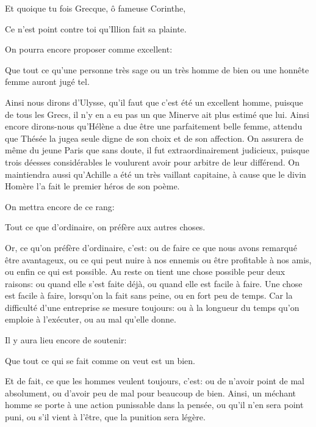 \begin{emphpar}
	   Et quoique tu fois Grecque, ô fameuse Corinthe,
	   
	   Ce n'est point contre toi qu'Illion fait sa plainte.
\end{emphpar}

\bigbreak

On pourra encore proposer comme excellent:

\begin{emphpar}
	   Que tout ce qu'une personne très sage ou un très homme de bien ou une honnête femme auront jugé tel.
\end{emphpar}

Ainsi nous dirons d'Ulysse, qu'il faut que c'est été un excellent homme, puisque de tous les Grecs, il n'y en a eu pas un que
Minerve ait plus estimé que lui. Ainsi encore dirons-nous qu'Hélène a due être une parfaitement belle femme, attendu que Thésée
la jugea seule digne de son choix et de son affection. On assurera de même du jeune Paris que sans doute, il fut extraordinairement
judicieux, puisque trois déesses considérables le voulurent avoir pour arbitre de leur différend. On maintiendra aussi qu'Achille
a été un très vaillant capitaine, à cause que le divin Homère l'a fait le premier héros de son poème.

\bigbreak

On mettra encore de ce rang:

\begin{emphpar}
	   Tout ce que d'ordinaire, on préfère aux autres choses.
\end{emphpar}

Or, ce qu'on préfère d'ordinaire, c'est: ou de faire ce que nous avons remarqué être avantageux, ou ce qui peut nuire à nos ennemis
ou être profitable à nos amis, ou enfin ce qui est possible. Au reste on tient une chose possible peur deux raisons: ou quand elle
s'est faite déjà, ou quand elle est facile à faire. Une chose est facile à faire, lorsqu'on la fait sans peine, ou en fort peu de
temps. Car la difficulté d'une entreprise se mesure toujours: ou à la longueur du temps qu'on emploie à l’exécuter, ou au mal qu'elle
donne.

\bigbreak

Il y aura lieu encore de soutenir:

\begin{emphpar}
	  Que tout ce qui se fait comme on veut est un bien.
\end{emphpar}

Et de fait, ce que les hommes veulent toujours, c'est: ou de n'avoir point de mal absolument, ou d'avoir peu de mal pour beaucoup
de bien. Ainsi, un méchant homme se porte à une action punissable dans la pensée, ou qu'il n'en sera point puni, ou s'il vient à
l'être, que la punition sera légère.

